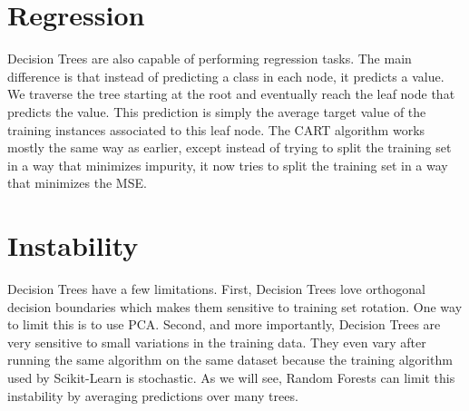 \documentclass[letterpaper]{article}
\begin{document}
\section{Regression}
Decision Trees are also capable of performing regression tasks. The main difference is that instead of predicting a class in each node, it predicts a value. We traverse the tree starting at the root and eventually reach the leaf node that predicts the value. This prediction is simply the average target value of the training instances associated to this leaf node. The CART algorithm works mostly the same way as earlier, except instead of trying to split the training set in a way that minimizes impurity, it now tries to split the training set in a way that minimizes the MSE. 

\section{Instability}
Decision Trees have a few limitations. First, Decision Trees love orthogonal decision boundaries which makes them sensitive to training set rotation. One way to limit this is to use PCA. Second, and more importantly, Decision Trees are very sensitive to small variations in the training data. They even vary after running the same algorithm on the same dataset because the training algorithm used by Scikit-Learn is stochastic. As we will see, Random Forests can limit this instability by averaging predictions over many trees. 
\end{document}
